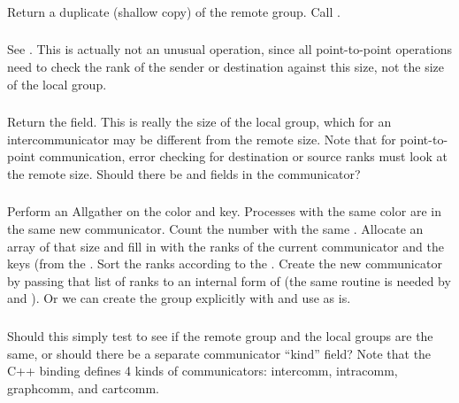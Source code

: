 \documentclass{article}
\begin{document}
\subsubsection{}
\begin{adi3}
  Return a duplicate (shallow copy) of the remote group.  Call
  . 
\end{adi3}

\subsubsection{}
See .  This is actually not an unusual operation,
since all point-to-point operations need to check the rank of the
sender or destination against this size, not the size of the local
group.  

\subsubsection{}
Return the  field.  This is really the size of the local
group, which for an intercommunicator may be different from the remote
size.  Note that for point-to-point communication, error checking for
destination or source ranks must look at the remote size.  Should
there be  and  fields
in the communicator? 

\subsubsection{}
Perform an Allgather on the color and key.  Processes with the same color are
in the same new communicator.  Count the number with the same
.  Allocate an array of that size and fill in with the
ranks of the current communicator and the keys (from the
.  Sort the ranks according to the .
Create the new communicator by passing that list of ranks to an
internal form of  (the same routine is needed
by  and ).  Or
we can create the group explicitly with  and
use  as is.

\subsubsection{}
Should this simply test to see if the remote group and the local groups are
the same, or should there be a separate communicator ``kind'' field?  Note
that the C++ binding defines 4 kinds of communicators: intercomm, intracomm,
graphcomm, and cartcomm. 
\end{document}
